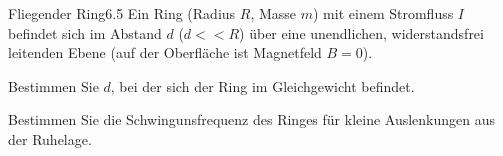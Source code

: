 \begin{problem}{Fliegender Ring}{6.5}
Ein Ring (Radius $R$, Masse $m$) mit einem Stromfluss $I$ befindet sich im Abstand $d$ ($d<<R$) über eine unendlichen, widerstandsfrei leitenden Ebene (auf der Oberfläche ist Magnetfeld $B=0$).
\begin{abcenum}
\item Bestimmen Sie $d$, bei der sich der Ring im Gleichgewicht befindet.
\item Bestimmen Sie die Schwingunsfrequenz des Ringes für kleine Auslenkungen aus der Ruhelage.
\end{abcenum}
\end{problem}




